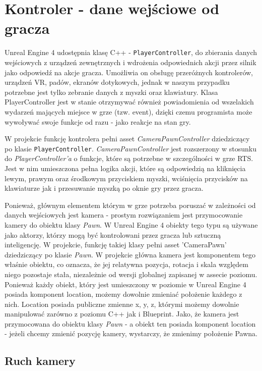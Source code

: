 \documentclass[12pt]{report}
\begin{document}
\section{Kontroler - dane wejściowe od gracza}
Unreal Engine 4 udostępnia klasę C++ - \texttt{PlayerController}, do zbierania danych wejściowych z urządzeń zewnętrznych i wdrożenia odpowiednich akcji przez silnik jako odpowiedź na akcje gracza. Umożliwia on obsługę przeróżnych kontrolerów, urządzeń VR, padów, ekranów dotykowych, jednak w naszym przypadku potrzebne jest tylko zebranie danych z myszki oraz klawiatury. Klasa PlayerController jest w stanie otrzymywać również powiadomienia od wszelakich wydarzeń mających miejsce w grze (tzw. event), dzięki czemu programista może wywoływać swoje funkcje od razu - jako reakcje na stan gry.

W projekcie funkcję kontrolera pełni asset \textit{CameraPawnController} dziedziczący po klasie \texttt{PlayerController}. \textit{CameraPawnController} jest rozszerzony w stosunku do \textit{PlayerController'a} o funkcje, które są potrzebne w szczególności w grze RTS. Jest w nim umieszczona pełna logika akcji, które są odpowiedzią na kliknięcia lewym, prawym oraz środkowym przyciskiem myszki, wciśnięcia przycisków na klawiaturze jak i przesuwanie myszką po oknie gry przez gracza.

Ponieważ, głównym elementem którym w grze potrzeba poruszać w zależności od danych wejściowych jest kamera - prostym rozwiązaniem jest przymocowanie kamery do obiektu klasy \textit{Pawn}. W Unreal Engine 4 obiekty tego typu są używane jako aktorzy, którzy mogą być kontrolowani przez gracza lub sztuczną inteligencję. W projekcie, funkcję takiej klasy pełni asset 'CameraPawn' dziedziczący po klasie \textit{Pawn}. W projekcie główna kamera jest komponentem tego właśnie obiektu, co oznacza, że jej relatywna pozycja, rotacja i skala względem niego pozostaje stała, niezależnie od wersji globalnej zapisanej w assecie poziomu. Ponieważ każdy obiekt, który jest umieszczony w poziomie w Unreal Engine 4 posiada komponent location, możemy dowolnie zmieniać położenie każdego z nich. Location posiada publiczne zmienne x, y, z, którymi możemy dowolnie manipulować zarówno z poziomu C++ jak i Blueprint. Jako, że kamera jest przymocowana do obiektu klasy \textit{Pawn} - a obiekt ten posiada komponent location - jeżeli chcemy zmienić pozycję kamery, wystarczy, że zmienimy położenie Pawna.

\subsection{Ruch kamery}
\end{document}
